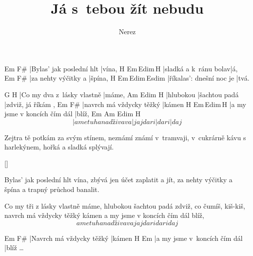 \documentclass{song}
\author{Nerez}
\title{Já s~tebou žít nebudu}
\begin{document}
\strophe
Em                       F\#\7
|Bylas' jak poslední hlt |vína,
H\7                   Em\,Edim\,H\7
|sladká a k~ránu bolav|á,
Em                  F\#\7
|za nehty výčitky a |špína,
H\7                      Em\,Edim\,Esdim
|říkalas': dnešní noc je |tvá.
\endstrophe

G                          H\7
|Co my dva z~lásky vlastně |máme,
Am        Edim          H\7
|hlubokou |šachtou padá |zdviž, já říkám ,
Em                       F\#\7
|navrch má vždycky těžký |kámen
H\7                          Em\,Edim\,H\7
|a my jsme v koncích čím dál |blíž,
   Em                     Am        Edim  H\7
\[ |a me tu ha nadži vava |jaj dari |dari |daj \]
\endstrophe

\strophe*
Zejtra tě potkám za svým stínem, 
neznámí známí v~tramvaji, 
v~cukrárně kávu s harlekýnem, 
hořká a sladká splývají. 
\endstrophe

\ref{}

\strophe*
Bylas' jak poslední hlt vína,
zbývá jen účet zaplatit a jít,
za nehty výčitky a špína
a trapný průchod banalit.
\endstrophe

Co my tři z lásky vlastně máme, 
hlubokou šachtou padá zdviž, co čumíš, kiš-kiš, 
navrch má vždycky těžký kámen 
a my jsme v koncích čím dál blíž, 
\[ a me tu ha nadži vava jaj dari dari daj \]
\endstrophe

\strophe
Em                       F\#\7
|Navrch má vždycky těžký |kámen
H\7                          Em
|a my jsme v~koncích čím dál |blíž \ldots{}
\endstrophe
\end{document}
